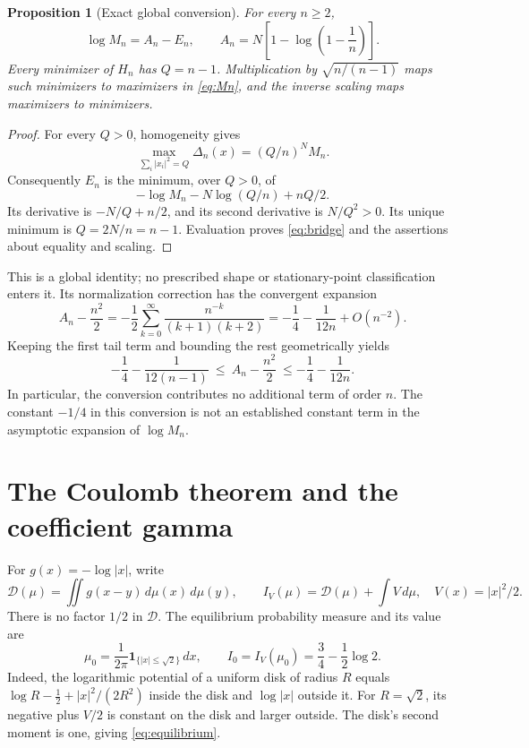 \documentclass[11pt,a4paper]{article}
\newtheorem{proposition}[theorem]{Proposition}
\theoremstyle{remark}
\newcommand{\dd}{\,d}
\newcommand{\ind}{\mathbf 1}
\newcommand{\D}{\mathcal D}
\numberwithin{equation}{section}
\begin{document}
\begin{proposition}[Exact global conversion]\label{prop:bridge}
For every \(n\ge2\),
\begin{equation}\label{eq:bridge}
 \log M_n=A_n-E_n,\qquad
 A_n=N\left[1-\log\left(1-\frac1n\right)\right].
\end{equation}
Every minimizer of \(H_n\) has \(Q=n-1\). Multiplication by
\(\sqrt{n/(n-1)}\) maps such minimizers to maximizers in \eqref{eq:Mn},
and the inverse scaling maps maximizers to minimizers.
\end{proposition}
\begin{proof}
For every \(Q>0\), homogeneity gives
\[
 \max_{\sum_i|x_i|^2=Q}\Delta_n(x)=(Q/n)^N M_n.
\]
Consequently \(E_n\) is the minimum, over \(Q>0\), of
\[
 -\log M_n-N\log(Q/n)+nQ/2.
\]
Its derivative is \(-N/Q+n/2\), and its second derivative is \(N/Q^2>0\).
Its unique minimum is \(Q=2N/n=n-1\). Evaluation proves
\eqref{eq:bridge} and the assertions about equality and scaling.
\end{proof}
This is a global identity; no prescribed shape or stationary-point
classification enters it. Its normalization correction has the
convergent expansion
\begin{equation}\label{eq:Aseries}
 A_n-\frac{n^2}{2}
 =-\frac12\sum_{k=0}^{\infty}
       \frac{n^{-k}}{(k+1)(k+2)}
 =-\frac14-\frac1{12n}+O(n^{-2}).
\end{equation}
Keeping the first tail term and bounding the rest geometrically yields
\[
 -\frac14-\frac1{12(n-1)}
 \ \le\ A_n-\frac{n^2}{2}\
 \le-\frac14-\frac1{12n}.
\]
In particular, the conversion contributes no additional term of order
\(n\). The constant \(-1/4\) in this conversion is not an established
constant term in the asymptotic expansion of \(\log M_n\).

\section{The Coulomb theorem and the coefficient gamma}
For \(g(x)=-\log|x|\), write
\[
 \D(\mu)=\iint g(x-y)\dd\mu(x)\dd\mu(y),\qquad
 I_V(\mu)=\D(\mu)+\int V\dd\mu,\quad V(x)=|x|^2/2.
\]
There is no factor \(1/2\) in \(\D\). The equilibrium probability measure
and its value are
\begin{equation}\label{eq:equilibrium}
 \mu_0=\frac1{2\pi}\ind_{\{|x|\le\sqrt2\}}\dd x,\qquad
 I_0=I_V(\mu_0)=\frac34-\frac12\log2.
\end{equation}
Indeed, the logarithmic potential of a uniform disk of radius \(R\)
equals \(\log R-\frac12+|x|^2/(2R^2)\) inside the disk and
\(\log|x|\) outside it. For \(R=\sqrt2\), its negative plus \(V/2\) is
constant on the disk and larger outside. The disk's second moment is
one, giving \eqref{eq:equilibrium}.
\end{document}
